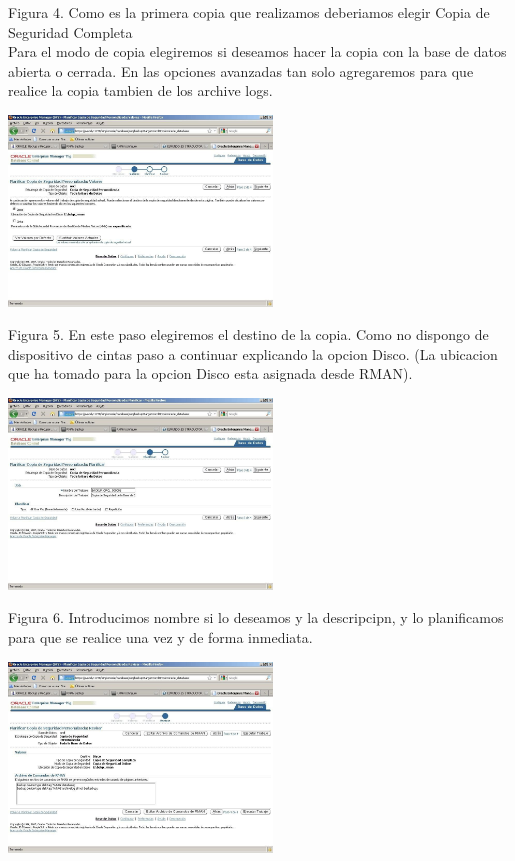 \documentclass[a4paper,twocolumn,10pt]{article}
\begin{document}
\begin{enumerate}[4.1]
\begin{center}
	\end{center}
	Figura 4. Como  es  la  primera  copia  que  realizamos  deberiamos  elegir  Copia  de  Seguridad Completa
	\\Para el modo de copia elegiremos si deseamos hacer la copia con la base de datos abierta o cerrada. En las opciones avanzadas tan solo agregaremos para que realice la copia tambien de los archive logs.
	\begin{center}
	\includegraphics[width=7cm]{./Imagenes/b4}  
	\end{center}
	Figura 5. En este paso elegiremos el destino de la copia. Como no dispongo de dispositivo de cintas paso a continuar explicando la opcion Disco. (La ubicacion que ha tomado para la opcion Disco esta asignada desde RMAN).
	\begin{center}
	\includegraphics[width=7cm]{./Imagenes/b5}  
	\end{center}
	Figura 6. Introducimos nombre si lo deseamos y la descripcipn, y lo planificamos para que se realice una vez y de forma inmediata.
	\begin{center}
	\includegraphics[width=7cm]{./Imagenes/b6}  

\end{center}
\end{enumerate}
\end{document}
